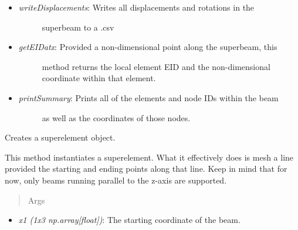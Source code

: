 \documentclass[letterpaper,10pt,english]{sphinxmanual}
\begin{document}
\begin{fulllineitems}
\begin{itemize}
\begin{description}
\end{description}

\item {} \begin{description}
\item[{\emph{writeDisplacements}: Writes all displacements and rotations in the}] \leavevmode
superbeam to a .csv

\end{description}

\item {} \begin{description}
\item[{\emph{getEIDatx}: Provided a non-dimensional point along the superbeam, this}] \leavevmode
method returns the local element EID and the non-dimensional
coordinate within that element.

\end{description}

\item {} \begin{description}
\item[{\emph{printSummary}: Prints all of the elements and node IDs within the beam}] \leavevmode
as well as the coordinates of those nodes.

\end{description}

\end{itemize}

\begin{fulllineitems}
\label{structures:AeroComBAT.Structures.SuperBeam.__init__}
Creates a superelement object.

This method instantiates a superelement. What it effectively does is
mesh a line provided the starting and ending points along that line.
Keep in mind that for now, only beams running parallel to the z-axis
are supported.
\begin{quote}\begin{description}
\item[{Args}] \leavevmode
\end{description}\end{quote}
\begin{itemize}
\item {} 
\emph{x1 (1x3 np.array{[}float{]})}: The starting coordinate of the beam.


\end{itemize}
\end{fulllineitems}
\end{fulllineitems}
\end{document}
